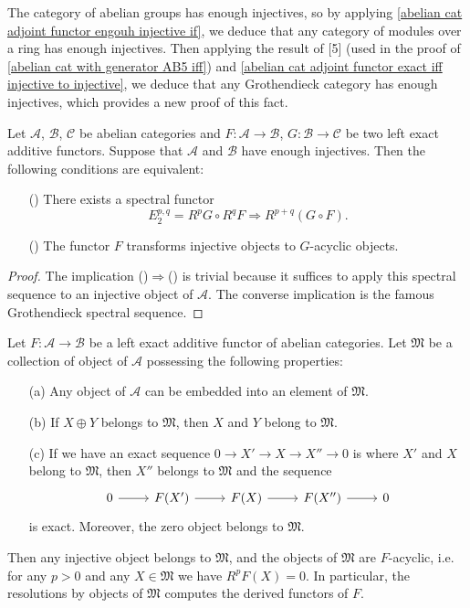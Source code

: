\begin{remark}
The category of abelian groups has enough injectives, so by applying \cref{abelian cat adjoint functor engouh injective if}, we deduce that any category of modules over a ring has enough injectives. Then applying the result of [5] (used in the proof of \cref{abelian cat with generator AB5 iff}) and \cref{abelian cat adjoint functor exact iff injective to injective}, we deduce that any Grothendieck category has enough injectives, which provides a new proof of this fact.
\end{remark}

\begin{proposition}\label{abelian category G spectral sequence iff injective to acyclic}
Let $\mathcal{A}$, $\mathcal{B}$, $\mathcal{C}$ be abelian categories and $F:\mathcal{A}\to \mathcal{B}$, $G:\mathcal{B}\to \mathcal{C}$ be two left exact additive functors. Suppose that $\mathcal{A}$ and $\mathcal{B}$ have enough injectives. Then the following conditions are equivalent:
\begin{enumerate}
    \item[(\rmnum{1})] There exists a spectral functor
    \[E_2^{p,q}=R^pG\circ R^qF\Rightarrow R^{p+q}(G\circ F).\]
    \item[(\rmnum{2})] The functor $F$ transforms injective objects to $G$-acyclic objects. 
\end{enumerate}
\end{proposition}
\begin{proof}
The implication ()$\Rightarrow$() is trivial because it suffices to apply this spectral sequence to an injective object of $\mathcal{A}$. The converse implication is the famous Grothendieck spectral sequence.
\end{proof}

\begin{proposition}\label{abelian category acyclic collection if}
Let $F:\mathcal{A}\to \mathcal{B}$ be a left exact additive functor of abelian categories. Let $\mathfrak{M}$ be a collection of object of $\mathcal{A}$ possessing the following properties:
\begin{enumerate}
    \item[(a)] Any object of $\mathcal{A}$ can be embedded into an element of $\mathfrak{M}$.
    \item[(b)] If $X\oplus Y$ belongs to $\mathfrak{M}$, then $X$ and $Y$ belong to $\mathfrak{M}$.
    \item[(c)] If we have an exact sequence $0\to X'\to X\to X''\to 0$ is where $X'$ and $X$ belong to $\mathfrak{M}$, then $X''$ belongs to $\mathfrak{M}$ and the sequence
    \[\begin{tikzcd}
        0\ar[r]&F(X')\ar[r]&F(X)\ar[r]&F(X'')\ar[r]&0
    \end{tikzcd}\]
    is exact. Moreover, the zero object belongs to $\mathfrak{M}$.
\end{enumerate}
Then any injective object belongs to $\mathfrak{M}$, and the objects of $\mathfrak{M}$ are $F$-acyclic, i.e. for any $p>0$ and any $X\in\mathfrak{M}$ we have $R^pF(X)=0$. In particular, the resolutions by objects of $\mathfrak{M}$ computes the derived functors of $F$.
\end{proposition}

